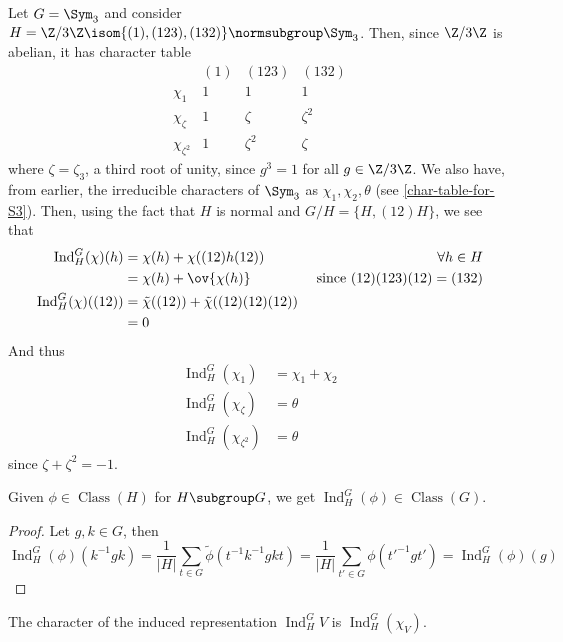 \documentclass[11pt,leqno,oneside]{amsbook}
\newcommand{\Class}{\operatorname{Class}}
\newcommand{\Ind}{\operatorname{Ind}}
\numberwithin{thm}{section}
\begin{document}
\begin{example}
  Let \(G = \Sym_3\) and consider \(H = \Z/3\Z \isom \{(1),(123),(132)\} \normsubgroup
  \Sym_3\). Then, since \(\Z/3\Z\) is abelian, it has character
  table \[
    \begin{array}{c|ccc}
      & (1) & (123) & (132) \\
      \hline
      \chi_1 & 1 & 1 & 1 \\
      \chi_{\zeta} & 1 & \zeta & \zeta^2 \\
      \chi_{\zeta^2} & 1 & \zeta^2 & \zeta
    \end{array}
  \]
  where \(\zeta = \zeta_3\), a third root of unity, since \(g^3 = 1\)
  for all \(g \in \Z/3\Z\). We also have, from earlier, the
  irreducible characters of \(\Sym_3\) as \(\chi_1,\chi_2,\theta\)
  (see \ref{char-table-for-S3}). 
  Then, using the fact that \(H\) is normal and \(G/H = \{H, (12)H\}\),
  we see that
  \begin{align*}
    \Ind_H^G(\chi)(h) & = \chi(h) + \chi((12)h(12)) & \forall h \in H
    \\
    & = \chi(h) + \ov{\chi(h)} & \text{ since }(12)(123)(12) = (132)\\
    \Ind_H^G(\chi)((12)) & = \tilde{\chi}((12)) +
                             \tilde{\chi}((12)(12)(12)) \\
    & = 0
  \end{align*}
  And thus
  \begin{align*}
    \Ind_H^G(\chi_1) & = \chi_1 + \chi_2 \\
    \Ind_H^G(\chi_\zeta) & = \theta \\
    \Ind_H^G(\chi_{\zeta^2}) & = \theta
  \end{align*}
  since \(\zeta + \zeta^2 = -1\).
\end{example}
\begin{prop}
  Given \(\phi \in \Class(H)\) for \(H \subgroup G\), we get
  \(\Ind_H^G(\phi) \in \Class(G)\).
\end{prop}
\begin{proof}
  Let \(g,k \in G\), then \[
    \Ind_H^G(\phi)(k^{-1}gk) = \frac{1}{|H|} \sum_{t \in G}
    \tilde{\phi}(t^{-1}k^{-1}gkt) = \frac{1}{|H|} \sum_{t' \in G}
    \phi(t'^{-1}gt') = \Ind_H^G(\phi)(g)
  \]
\end{proof}
\begin{thm}
  The character of the induced representation \(\Ind_H^G V\) is \(\Ind_H^G(\chi_V)\).
\end{thm}
\end{document}
